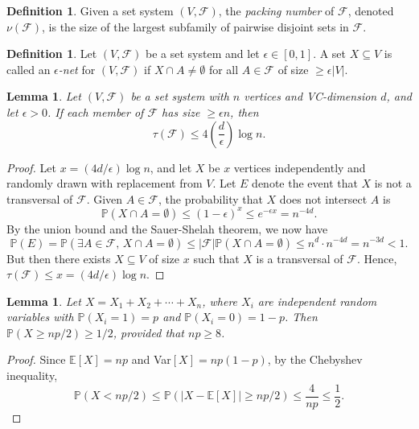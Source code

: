 \documentclass[12pt,reqno]{amsart}
\newtheorem{lemma}[theorem]{Lemma}
\theoremstyle{definition}
\newtheorem{definition}[theorem]{Definition}
\theoremstyle{remark}
\renewcommand{\leq}{\leqslant}
\renewcommand{\geq}{\geqslant}
\def\F{\mathcal{F}}
\def\E{\mathbb{E}}
\def\P{\mathbb{P}}
\numberwithin{equation}{section}
\begin{document}
\begin{definition}
	Given a set system $(V, \F)$, the \textit{packing number} of $\F$, denoted $\nu(\F)$, is the size of the largest subfamily of pairwise disjoint sets in $\F$.
\end{definition}

\begin{definition}
	Let $(V, \F)$ be a set system and let $\epsilon \in [0, 1]$. A set $X \subseteq V$ is called an \textit{$\epsilon$-net} for $(V, \F)$ if $X \cap A \neq \emptyset$ for all $A \in \F$ of size $\geq \epsilon|V|$.
\end{definition}

\begin{lemma}
	Let $(V, \F)$ be a set system with $n$ vertices and VC-dimension $d$, and let $\epsilon > 0$. If each member of $\F$ has size $\geq \epsilon n$, then
	\[
		\tau(\F) \leq 4\left(\frac{d}{\epsilon}\right)\log n.
	\]
\end{lemma}

\begin{proof}
	Let $x = (4d/\epsilon)\log n$, and let $X$ be $x$ vertices independently and randomly drawn with replacement from $V$. Let $E$ denote the event that $X$ is not a transversal of $\F$. Given $A \in \F$, the probability that $X$ does not intersect $A$ is
	\[
		\mathbb{P}(X \cap A = \emptyset) \leq (1 - \epsilon)^x \leq e^{-\epsilon x} = n^{-4d}.
	\] 
	By the union bound and the Sauer-Shelah theorem, we now have
	\[
		\mathbb{P}(E) = \mathbb{P}(\exists A \in \F, \, X \cap A = \emptyset) \leq |\F|\mathbb{P}(X \cap A = \emptyset) \leq n^d \cdot n^{-4d} = n^{-3d} < 1.
	\]
	But then there exists $X \subseteq V$ of size $x$ such that $X$ is a transversal of $\F$. Hence, $\tau(\F) \leq x = (4d/\epsilon)\log n$.
\end{proof}

\begin{lemma}\label{lem:chebyshev}
	Let $X = X_1 + X_2 + \cdots + X_n$, where $X_i$ are independent random variables with $\P(X_i = 1) = p$ and $\P(X_i = 0) = 1 - p$. Then $\P(X \geq np/2) \geq 1/2$, provided that $np \geq 8$.
\end{lemma}

\begin{proof}
	Since $\E[X] = np$ and Var$[X] = np(1 - p)$, by the Chebyshev inequality,
	\[
		\P(X < np/2) \leq \P(|X - \E[X]| \geq np/2) \leq \frac{4}{np} \leq \frac{1}{2}.
	\]
\end{proof}

\newpage
\end{document}
